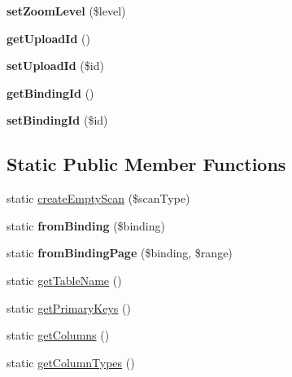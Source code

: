 \begin{DoxyCompactItemize}
\item 
\hypertarget{classScan_aa5863f8a7d2ae5b0cc7031a9bfbe95c3}{
{\bfseries setZoomLevel} (\$level)}
\label{classScan_aa5863f8a7d2ae5b0cc7031a9bfbe95c3}

\item 
\hypertarget{classScan_a0c9f1882dfffc926d467c965cf5a6268}{
{\bfseries getUploadId} ()}
\label{classScan_a0c9f1882dfffc926d467c965cf5a6268}

\item 
\hypertarget{classScan_aca340f58f479e7bf977147daa04ee600}{
{\bfseries setUploadId} (\$id)}
\label{classScan_aca340f58f479e7bf977147daa04ee600}

\item 
\hypertarget{classScan_ac218b7dc038391a7b28c7f349a5e118d}{
{\bfseries getBindingId} ()}
\label{classScan_ac218b7dc038391a7b28c7f349a5e118d}

\item 
\hypertarget{classScan_a1a8bc072e1803d13a6960f4aa3ff8d5b}{
{\bfseries setBindingId} (\$id)}
\label{classScan_a1a8bc072e1803d13a6960f4aa3ff8d5b}

\end{DoxyCompactItemize}
\subsection*{Static Public Member Functions}
\begin{DoxyCompactItemize}
\item 
static \hyperlink{classScan_a72b5430d02418d3172fce94f5dac3535}{createEmptyScan} (\$scanType)
\item 
\hypertarget{classScan_abc15811492a84be59c482e562a73cd22}{
static {\bfseries fromBinding} (\$binding)}
\label{classScan_abc15811492a84be59c482e562a73cd22}

\item 
\hypertarget{classScan_a6b5542f995d5f444adb53595972261fa}{
static {\bfseries fromBindingPage} (\$binding, \$range)}
\label{classScan_a6b5542f995d5f444adb53595972261fa}

\item 
static \hyperlink{classScan_ad9ada4df484a671439f131458e22d2e0}{getTableName} ()
\item 
static \hyperlink{classScan_a0e7fe3c9a64e4655114a82473fc78827}{getPrimaryKeys} ()
\item 
static \hyperlink{classScan_a51a201a61df50b19fd6a7b96d7521ca5}{getColumns} ()
\item 
static \hyperlink{classScan_a9ae3218caa7bc866a8b914eab7b649a2}{getColumnTypes} ()
\end{DoxyCompactItemize}
